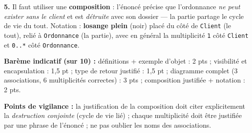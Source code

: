 \documentclass[11pt]{article}
\begin{document}
\begin{corrige}
\textbf{5.} Il faut utiliser une \textbf{composition} : l'énoncé précise que l'ordonnance \emph{ne peut exister sans le client} et est \emph{détruite} avec son dossier — la partie partage le cycle de vie du tout. Notation : \textbf{losange plein} (noir) placé du côté de \texttt{Client} (le tout), relié à \texttt{Ordonnance} (la partie), avec en général la multiplicité \texttt{1} côté \texttt{Client} et \texttt{0..*} côté \texttt{Ordonnance}.

\textbf{Barème indicatif (sur 10) :} définitions + exemple d'objet : 2 pts ; visibilité et encapsulation : 1,5 pt ; type de retour justifié : 1,5 pt ; diagramme complet (3 associations, 6 multiplicités correctes) : 3 pts ; composition justifiée + notation : 2 pts.

\textbf{Points de vigilance :} la justification de la composition doit citer explicitement la \emph{destruction conjointe} (cycle de vie lié) ; chaque multiplicité doit être justifiée par une phrase de l'énoncé ; ne pas oublier les noms des associations.
\end{corrige}
\end{document}
